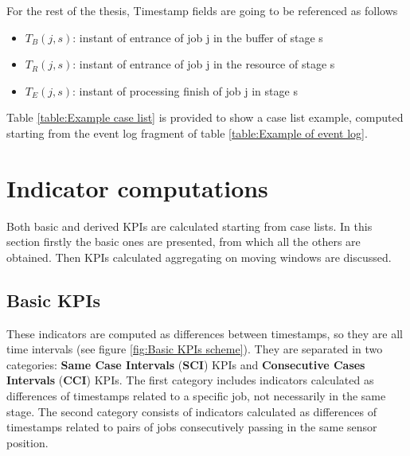 For the rest of the thesis, Timestamp fields are going to be referenced as follows
\begin{itemize}
\item $T_B(j,s)$: instant of entrance of job j in the buffer of stage s
\item $T_R(j,s)$: instant of entrance of job j in the resource of stage s
\item $T_E(j,s)$: instant of processing finish of job j in stage s
\end{itemize}
\begin{table}[ht]
\caption{Example of case list}
\centering
\label{table:Example case list}
\end{table}
Table \ref{table:Example case list} is provided to show a case list example, computed starting from the event log fragment of table \ref{table:Example of event log}.
\section{Indicator computations}
\label{Indicator computations}
Both basic and derived KPIs are calculated starting from case lists. In this section firstly the basic ones are presented, from which all the others are obtained. Then KPIs calculated aggregating on moving windows are discussed. 
\subsection{Basic KPIs}
\label{Basic KPIs}
These indicators are computed as differences between timestamps, so they are all time intervals (see figure \ref{fig:Basic KPIs scheme}). They are separated in two categories: \textbf{Same Case Intervals} (\textbf{SCI}) KPIs and \textbf{Consecutive Cases Intervals} (\textbf{CCI}) KPIs. The first category includes indicators calculated as differences of timestamps related to a specific job, not necessarily in the same stage. The second category consists of indicators calculated as differences of timestamps related to pairs of jobs consecutively passing in the same sensor position. 
